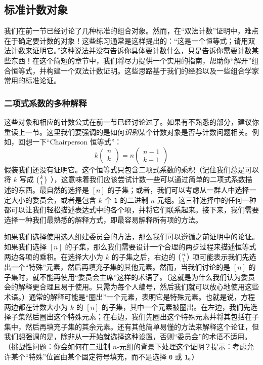 
\subsection{标准计数对象}

我们在前一节已经讨论了几种标准的组合对象。然而，在``双法计数''证明中，难点在于确定要计数的对象！这些练习通常是这样提出的：``这是一个恒等式；请用双法计数来证明它。''这种说法并没有告诉你具体要计数什么，只是告诉你需要计数某些东西！在这个简短的章节中，我们将尽力提供一个实用的指南，帮助你``解开''组合恒等式，并构建一个双法计数证明。这些思路基于我们的经验以及一些组合学家常用的标准论证。

\subsubsection*{二项式系数的多种解释}

这些对象和相应的计数公式在前一节已经讨论过了。如果有不熟悉的部分，建议你重读上一节。这里我们要强调的是如何\emph{识别}某个计数对象是否与计数问题相关。例如，回想一下``Chairperson 恒等式''：
\[k\begin{pmatrix}n\\k\end{pmatrix} = n\begin{pmatrix}n-1\\k-1\end{pmatrix}\]
假装我们还没有证明它。这个恒等式只包含二项式系数的乘积（记住我们总是可以将 $k$ 写成 $\big({k \atop 1}\big)$ ），这意味着我们应该尝试计数一些可以通过简单的二项式系数描述的东西。最自然的选择是 $[n]$ 的子集；或者，我们可以考虑从一群人中选择一定大小的委员会，或者是包含 $k$ 个 \verb|1| 的二进制 $n$-元组。这三种选择中的任何一种都可以让我们轻松描述表达式中的各个项，并将它们联系起来。接下来，我们需要选择一种我们最熟悉的解释方式，即最容易解释所有项的方法。

如果我们选择使用选人组建委员会的方法，那么我们可以遵循之前证明中的论证。如果我们选择 $[n]$ 的子集，那么我们需要设计一个合理的两步过程来描述恒等式两边各项的乘积。在选择大小为 $k$ 的子集之后，右边的 $\big({n \atop 1}\big)$ 项可能表示我们先选出一个``特殊''元素，然后再填充子集的其他元素。然而，当我们讨论的是 $[n]$ 的子集时，就不能再使用``委员会主席''这样的术语了。（这就是为什么我们认为委员会的解释更合理且易于使用。只需为每个人编号，然后我们就可以放心地使用这些术语。）通常的解释可能是``圈出''一个元素，表明它是特殊元素。也就是说，方程两边都在计数大小为 $k$ 的 $[n]$ 的子集，其中一个元素被圈出。在左边，我们先选择子集然后圈出这个特殊元素；在右边，我们先圈出这个特殊元素并将其包括在子集中，然后再填充子集的其余元素。还有其他简单易懂的方法来解释这个论证，但我们想强调的是，除非从一开始就选择这种设置，否则``委员会''的术语不适用。（挑战性问题：你会如何在二进制 $n$-元组的背景下处理这个证明？提示：考虑允许某个``特殊''位置由某个固定符号填充，而不是选择 \verb|0| 或 \verb|1|。）

